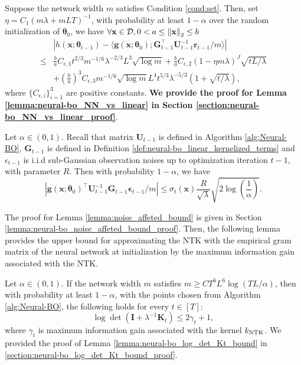 \begin{auxlemma} 
\label{lemma:neural-bo_NN_vs_linear}
Suppose the network width $m$ satisfies Condition \ref{cond:set}.
Then, set $\eta = C_1(m\lambda + mLT)^{-1}$, with probability at least $1 - \alpha$ over the random initialization of $\boldsymbol{\theta}_0$, we have $\forall \mathbf{x} \in \mathcal{D}, 0 < a \leq \norm{\bf x}_2  \leq b$
\begin{equation*}
\begin{split}
    & \left \lvert h(\mathbf{x}; \boldsymbol{\theta}_{t-1})- \langle \mathbf{g}(\mathbf{x}; \boldsymbol{\theta}_0); \mathbf{G}_{t-1}^\top \mathbf{U}^{-1}_{t-1} \mathbf{r}_{t-1}/m \rangle \right\rvert \\ 
    \leq &  \frac{b}{a} C_{\epsilon,1} t^{2/3}m^{-1/6} \lambda^{-2/3} L^3 \sqrt{\log m} + \frac{b}{a} C_{\epsilon,2}(1 - \eta m \lambda)^J \sqrt{tL/ \lambda}\\
    & + \left(\frac{b}{a} \right)^3 C_{\epsilon,3} m^{-1/6} \sqrt{\log m} L^4 t^{5/3} \lambda ^{-5/3} \left(1 + \sqrt{t/\lambda} \right),
\end{split}
\end{equation*}
where $\{C_{\epsilon,i}\}_{i=1}^3$ are positive constants. \textbf{We provide the proof for Lemma \ref{lemma:neural-bo_NN_vs_linear} in Section \ref{section:neural-bo_NN_vs_linear_proof}}.
\end{auxlemma}

\begin{auxlemma}
\label{lemma:noise_affeted_bound}
Let $\alpha \in (0,1)$. Recall that matrix $\mathbf{U}_{t-1}$ is defined in Algorithm \ref{alg:Neural-BO}, $\mathbf{G}_{t-1}$ is defined in Definition \ref{def:neural-bo_linear_kernelized_terms} and $\epsilon_{t-1}$ is i.i.d sub-Gaussian  observation noises up to optimization iteration $t-1$, with parameter $R$. Then with probability  $1-\alpha$, we have
\[ \left\lvert \mathbf{g}(\mathbf{x}; \boldsymbol{\theta}_0)^\top \mathbf{U}^{-1}_{t-1} \mathbf{G}_{t-1} \boldsymbol{\epsilon}_{t-1}/m   \right\rvert \leq \sigma_t(\mathbf{x})\frac{R}{\sqrt{\lambda}} \sqrt{2 \log(\frac{1}{\alpha})}.\]
\end{auxlemma}
The proof for Lemma \ref{lemma:noise_affeted_bound} is given in Section \ref{lemma:neural-bo_noise_affeted_bound_proof}. Then, the following lemma provides the upper bound for approximating the NTK with the empirical gram matrix of the neural network at initialization by the maximum information gain associated with the NTK. 

\begin{auxlemma}
\label{lemma:neural-bo_log_det_Kt_bound}
Let $\alpha \in (0,1)$. If the network width $m$ satisfies  $m \geq C T^6L^6 \log(TL/\alpha)$, then with probability at least $1-\alpha$, with the points chosen from Algorithm \ref{alg:Neural-BO}, the following holds for every $t \in [T]$:
\[ \log \det (\mathbf{I} + \lambda^{-1} \mathbf{K}_t) \le 2\gamma_t + 1,\]
where $\gamma_t$ is maximum information gain associated with the kernel $k_\textup{NTK}$. We provided the proof of Lemma \ref{lemma:neural-bo_log_det_Kt_bound} in \ref{section:neural-bo_log_det_Kt_bound_proof}.
\end{auxlemma}


